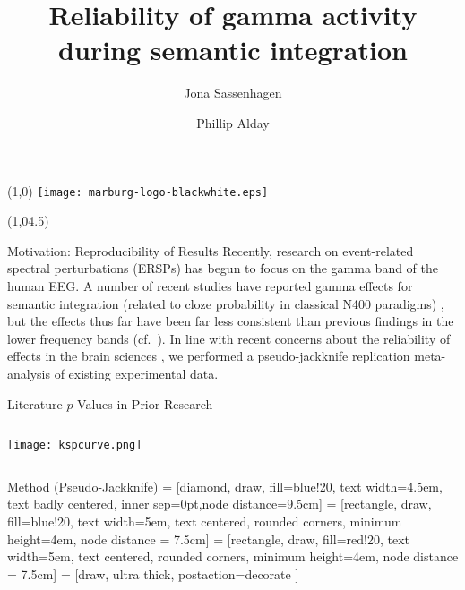 \documentclass[final]{beamer}
\title{Reliability of gamma activity during semantic integration}
\author{Jona Sassenhagen \and Phillip Alday}
\institute{University of Marburg}
\date{}
\newcommand{\subblock}[1]{\bigskip\textbf{#1}}
\begin{document}
\begin{frame}{} 	
\begin{textblock}{15}(1,0)
\texttt{[image: marburg-logo-blackwhite.eps]}
\end{textblock}


\begin{textblock}{45}(1,04.5)
\begin{block}{Motivation: Reproducibility of Results}
Recently, research on event-related spectral perturbations (ERSPs) has begun to focus on the gamma band of the human EEG. A number of recent studies have reported gamma effects for semantic integration (related to cloze probability in classical N400 paradigms) \cite{mellemfriedmanmedvedev2013a,wangzhubastiaansen2012a,penolazziangrillijob2009a,hagoort2008a,hagoorthaldbastiaansen2004a}, but the effects thus far have been far less consistent than previous findings in the lower frequency bands (cf.~\cite{bastiaansenhagoort2006a,heinetammhofmann2006a,rohmklimeschhaider2001a,davidsonindefrey2007a,roehmschlesewskybornkessel2004a}).
In line with recent concerns about the reliability of effects in the brain sciences \cite{vulharriswinkielman2009a,simmonsnelsonsimonsohn2011a,kilner2013a}, we performed a pseudo-jackknife replication meta-analysis of existing experimental data. 
\end{block}

\begin{block}{Literature \hfill $p$-Values in Prior Research}
\begin{columns}
\tiny


\texttt{[image: kspcurve.png]}
\end{columns}
\end{block}

\begin{block}{Method (Pseudo-Jackknife)}
\small
 = [diamond, draw, fill=blue!20, 
    text width=4.5em, text badly centered, inner sep=0pt,node distance=9.5cm]
 = [rectangle, draw, fill=blue!20, 
    text width=5em, text centered, rounded corners, minimum height=4em, node distance = 7.5cm]
 = [rectangle, draw, fill=red!20, 
    text width=5em, text centered, rounded corners, minimum height=4em, node distance = 7.5cm]
 = [draw, ultra thick, postaction={decorate}
									   ]
    

\end{block}
\end{textblock}
\end{frame}
\end{document}
